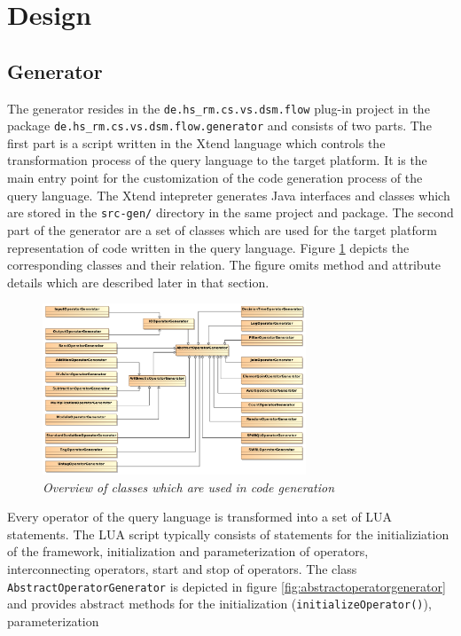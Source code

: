 \section{Design}
\subsection{Generator}
The generator resides in the \texttt{de.hs\_rm.cs.vs.dsm.flow} plug-in project 
in the package \texttt{de.hs\-\_rm.\-cs.vs.dsm.flow.generator} and consists of 
two parts. The first part is a script written in the Xtend \cite{xtend} language 
which controls the transformation process of the query language to the target 
platform. It is the main entry point for the customization of the code 
generation process of the query language. The Xtend intepreter generates 
Java interfaces and classes which are stored in the \texttt{src-gen/} directory
in the same project and package. The second part of the generator are a set of
classes which are used for the target platform representation of code written in
the query language. Figure \ref{fig:generator} depicts the corresponding classes
and their relation. The figure omits method and attribute details which are 
described later in that section.
\begin{figure}[htpb]
  \centering
  \includegraphics[width=0.7\textwidth]{figures/overview}
  \caption{\emph{Overview of classes which are used in code generation}}
  \label{fig:generator}
\end{figure}
Every operator of the query language is transformed into a set of LUA 
statements. The LUA script typically consists of statements for the 
initializiation of the framework, initialization and parameterization of 
operators, interconnecting operators, start and stop of operators. The class 
\texttt{AbstractOperatorGenerator} is depicted in figure 
\ref{fig:abstractoperatorgenerator} and provides abstract methods for the 
initialization (\texttt{initializeOperator()}), parameterization 
